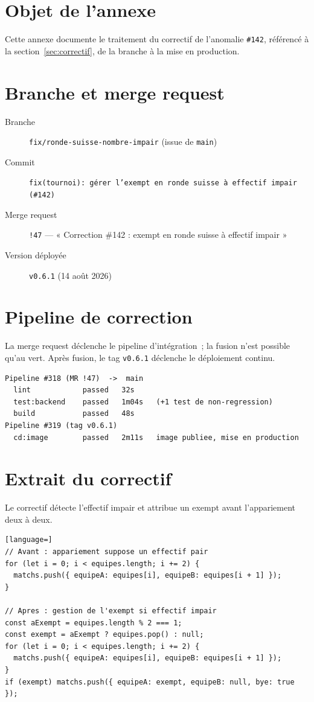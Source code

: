 \label{chap:annexe-correctif}
\section*{Objet de l'annexe}
Cette annexe documente le traitement du correctif de l'anomalie \texttt{\#142}, référencé à la section~\ref*{sec:correctif}, de la branche à la mise en production.

\section*{Branche et merge request}
\begin{description}
    \item[Branche] \texttt{fix/ronde-suisse-nombre-impair} (issue de \texttt{main})
    \item[Commit] \texttt{fix(tournoi): gérer l'exempt en ronde suisse à effectif impair (\#142)}
    \item[Merge request] \texttt{!47} --- « Correction \#142 : exempt en ronde suisse à effectif impair »
    \item[Version déployée] \texttt{v0.6.1} (14 août 2026)
\end{description}

\section*{Pipeline de correction}
La merge request déclenche le pipeline d'intégration~; la fusion n'est possible qu'au vert. Après fusion, le tag \texttt{v0.6.1} déclenche le déploiement continu.

\begin{lstlisting}
Pipeline #318 (MR !47)  ->  main
  lint            passed   32s
  test:backend    passed   1m04s   (+1 test de non-regression)
  build           passed   48s
Pipeline #319 (tag v0.6.1)
  cd:image        passed   2m11s   image publiee, mise en production
\end{lstlisting}

\section*{Extrait du correctif}
Le correctif détecte l'effectif impair et attribue un exempt avant l'appariement deux à deux.

\begin{lstlisting}[language=]
// Avant : appariement suppose un effectif pair
for (let i = 0; i < equipes.length; i += 2) {
  matchs.push({ equipeA: equipes[i], equipeB: equipes[i + 1] });
}

// Apres : gestion de l'exempt si effectif impair
const aExempt = equipes.length % 2 === 1;
const exempt = aExempt ? equipes.pop() : null;
for (let i = 0; i < equipes.length; i += 2) {
  matchs.push({ equipeA: equipes[i], equipeB: equipes[i + 1] });
}
if (exempt) matchs.push({ equipeA: exempt, equipeB: null, bye: true });
\end{lstlisting}

